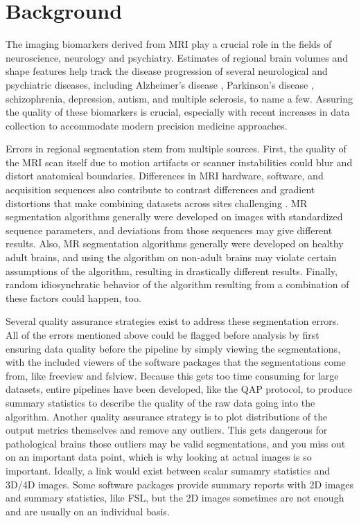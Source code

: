 \section{Background}


The imaging biomarkers derived from MRI play a crucial role in the fields of neuroscience, neurology and psychiatry. Estimates of regional brain volumes and shape features help track the disease progression of several neurological and psychiatric diseases, including Alzheimer's disease \cite{Vemuri_2010}, Parkinson's disease \cite{Silvia_Mangia_2013}, schizophrenia\cite{shenton2001review}, depression\cite{meisenzahl2011structural}, autism\cite{brambilla2003brain}, and multiple sclerosis\cite{Filippi_1995}, to name a few. Assuring the quality of these biomarkers is crucial, especially with recent increases in data collection to accommodate modern precision medicine approaches. 

Errors in regional segmentation stem from multiple sources. First, the quality of the MRI scan itself due to motion artifacts or scanner instabilities could blur and distort anatomical boundaries. Differences in MRI hardware, software, and acquisition sequences also contribute to contrast differences and gradient distortions that make combining datasets across sites challenging \cite{keshavan2016power}. MR segmentation algorithms generally were developed on images with standardized sequence parameters, and deviations from those sequences may give different results. Also, MR segmentation algorithms generally were developed on healthy adult brains, and using the algorithm on non-adult brains may violate certain assumptions of the algorithm, resulting in drastically different results. Finally, random idiosynchratic behavior of the algorithm resulting from a combination of these factors could happen, too.

Several quality assurance strategies exist to address these segmentation errors. All of the errors mentioned above could be flagged before analysis by first ensuring data quality before the pipeline by simply viewing the segmentations, with the included viewers of the software packages that the segmentations come from, like freeview and fslview. Because this gets too time consuming for large datasets, entire pipelines have been developed, like the QAP protocol, to produce summary statistics to describe the quality of the raw data going into the algorithm. Another quality assurance strategy is to plot distributions of the output metrics themselves and remove any outliers. This gets dangerous for pathological brains those outliers may be valid segmentations, and you miss out on an important data point, which is why looking at actual images is so important. Ideally, a link would exist between scalar sumamry statistics and 3D/4D images. Some software packages provide summary reports with 2D images and summary statistics, like FSL, but the 2D images sometimes are not enough and are usually on an individual basis. 

